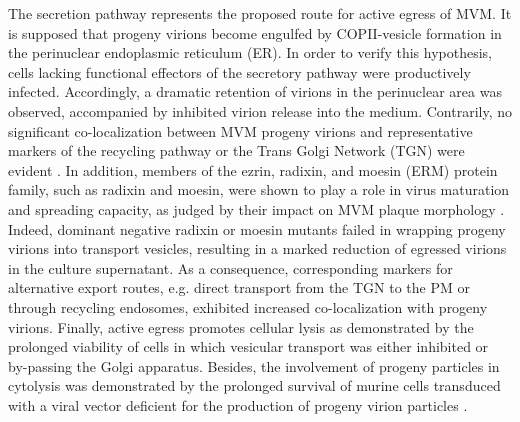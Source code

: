 The secretion pathway represents the proposed route for active egress of MVM. It is supposed that progeny virions become engulfed by COPII-vesicle formation in the perinuclear endoplasmic reticulum (ER). In order to verify this hypothesis, cells lacking functional effectors of the secretory pathway were productively infected.  Accordingly, a dramatic retention of virions in the perinuclear area was observed, accompanied by inhibited virion release into the medium. Contrarily, no significant co-localization between MVM progeny virions and representative markers of the recycling pathway or the Trans Golgi Network (TGN) were evident \cite{pmid24068925}. In addition, members of the ezrin, radixin, and moesin (ERM) protein family, such as radixin and moesin, were shown to play a role in virus maturation and spreading capacity, as judged by their impact on MVM plaque morphology \cite{pmid19321616}. Indeed, dominant negative radixin or moesin mutants failed in wrapping progeny virions into transport vesicles, resulting in a marked reduction of egressed virions in the culture supernatant. As a consequence, corresponding markers for alternative export routes, e.g. direct transport from the TGN to the PM or through recycling endosomes, exhibited increased co-localization with progeny virions. Finally, active egress promotes cellular lysis as demonstrated by the prolonged viability of cells in which vesicular transport was either inhibited or by-passing the Golgi apparatus. Besides, the involvement of progeny particles in cytolysis was demonstrated by the prolonged survival of murine cells transduced with a viral vector deficient for the production of progeny virion particles \cite{pmid24068925}.      


